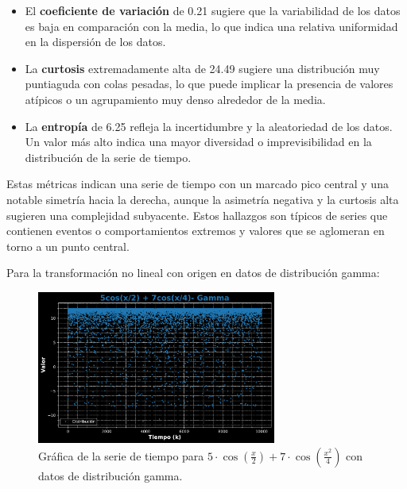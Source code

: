 \documentclass[11pt]{article} %
\begin{document}
\begin{itemize}
		\item El \textbf{coeficiente de variación} de 0.21 sugiere que la variabilidad de los datos es baja en comparación con la media, lo que indica una relativa uniformidad en la dispersión de los datos.
		
		\item La \textbf{curtosis} extremadamente alta de 24.49 sugiere una distribución muy puntiaguda con colas pesadas, lo que puede implicar la presencia de valores atípicos o un agrupamiento muy denso alrededor de la media.
		
		\item La \textbf{entropía} de 6.25 refleja la incertidumbre y la aleatoriedad de los datos. Un valor más alto indica una mayor diversidad o imprevisibilidad en la distribución de la serie de tiempo.
	\end{itemize}
	
	Estas métricas indican una serie de tiempo con un marcado pico central y una notable simetría hacia la derecha, aunque la asimetría negativa y la curtosis alta sugieren una complejidad subyacente. Estos hallazgos son típicos de series que contienen eventos o comportamientos extremos y valores que se aglomeran en torno a un punto central.
	
	
	\newpage
	
	Para la transformación no lineal con origen en datos de distribución gamma:
	\begin{figure}[h]
		\centering
		\includegraphics[width=0.7\textwidth]{../transformaciones/per_gamma1.pdf}
		\caption{Gráfica de la serie de tiempo para \( 5\cdot \cos\left(\frac{x}{2}\right) + 7\cdot \cos\left(\frac{x^2}{4}\right) \) con datos de distribución gamma.}
		\label{fig:perGammaGraf}
	\end{figure}
	
\end{document}
